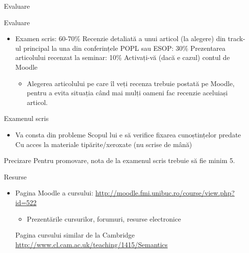 \documentclass[xcolor=pdftex,romanian,colorlinks]{beamer}
\begin{document}
\begin{section}{Evaluare}
\begin{frame}{Evaluare}
\begin{itemize}
\item Examen scris: 60-70\%
\vitem Recenzie detaliată a unui articol (la alegere) din track-ul principal la una din conferințele POPL sau ESOP: 30\%
\vitem Prezentarea articolului recenzat la seminar: 10\% 
\vitem Activați-vă (dacă e cazul) contul de Moodle
\begin{itemize}
\item Alegerea articolului pe care îl veți recenza trebuie postată pe Moodle, pentru a evita situația când mai mulți oameni fac recenzie aceluiași articol.
\end{itemize}
\end{itemize}
\end{frame}

\begin{frame}{Examenul scris}
\begin{itemize}
\item Va consta din probleme
\vitem Scopul lui e să verifice fixarea cunoștințelor predate
\vitem Cu acces la materiale tipărite/xeroxate (nu scrise de mână)
\end{itemize}

\begin{block}{Precizare}
Pentru promovare, nota de la examenul scris trebuie să fie minim 5.
\end{block}
\end{frame}
\end{section}

\begin{frame}{Resurse}
\begin{itemize}
\item Pagina Moodle a cursului: \url{http://moodle.fmi.unibuc.ro/course/view.php?id=522}
\begin{itemize}
\item Prezentările cursurilor, forumuri, resurse electronice
\end{itemize}
\vitem Pagina cursului similar de la Cambridge \url{http://www.cl.cam.ac.uk/teaching/1415/Semantics}
\end{itemize}
\end{frame}
\end{document}
